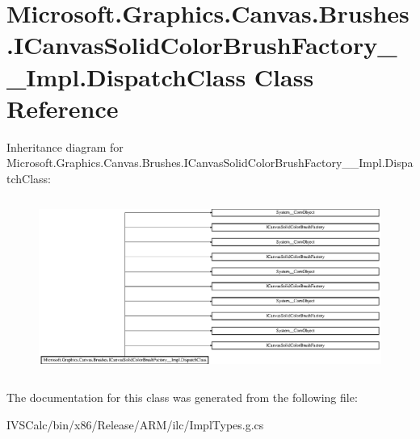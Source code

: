\hypertarget{class_microsoft_1_1_graphics_1_1_canvas_1_1_brushes_1_1_i_canvas_solid_color_brush_factory_____impl_1_1_dispatch_class}{}\section{Microsoft.\+Graphics.\+Canvas.\+Brushes.\+I\+Canvas\+Solid\+Color\+Brush\+Factory\+\_\+\+\_\+\+Impl.\+Dispatch\+Class Class Reference}
\label{class_microsoft_1_1_graphics_1_1_canvas_1_1_brushes_1_1_i_canvas_solid_color_brush_factory_____impl_1_1_dispatch_class}
Inheritance diagram for Microsoft.\+Graphics.\+Canvas.\+Brushes.\+I\+Canvas\+Solid\+Color\+Brush\+Factory\+\_\+\+\_\+\+Impl.\+Dispatch\+Class\+:\begin{figure}[H]
\begin{center}
\leavevmode
\includegraphics[height=5.800377cm]{class_microsoft_1_1_graphics_1_1_canvas_1_1_brushes_1_1_i_canvas_solid_color_brush_factory_____impl_1_1_dispatch_class}
\end{center}
\end{figure}


The documentation for this class was generated from the following file\+:\begin{DoxyCompactItemize}
\item 
I\+V\+S\+Calc/bin/x86/\+Release/\+A\+R\+M/ilc/Impl\+Types.\+g.\+cs\end{DoxyCompactItemize}
